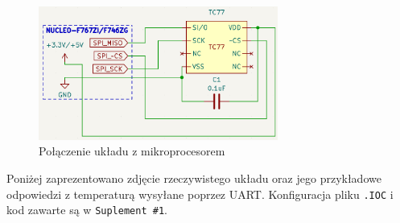 \documentclass[11pt, a4paper]{article}
\begin{document}
\vspace{0.25cm}
\begin{figure}[h]
    \centering
    \includegraphics[width=0.7\textwidth]{fig/TC77/polaczenie_modulu/nucleo_con.png}
    \caption{Połączenie układu z mikroprocesorem}
    \label{fig:_polaczenie_ukladu}
\end{figure}
\vspace{0.25cm}

Poniżej zaprezentowano zdjęcie rzeczywistego układu oraz jego przykładowe odpowiedzi z temperaturą wysyłane poprzez UART. Konfiguracja pliku \texttt{.IOC} i kod zawarte są w \texttt{Suplement \#1}.
\end{document}
